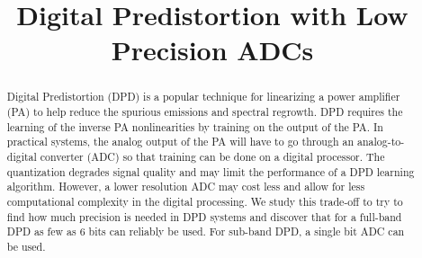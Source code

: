 \documentclass[conference]{IEEEtran}
\begin{document}
%
\title{Digital Predistortion with Low Precision ADCs}




% 
\author{
}




\maketitle

\begin{abstract}
Digital Predistortion (DPD) is a popular technique for linearizing a power amplifier (PA) to help reduce the spurious emissions and spectral regrowth. DPD requires the learning of the inverse PA nonlinearities by training on the output of the PA. In practical systems, the analog output of the PA will have to go through an analog-to-digital converter (ADC) so that training can be done on a digital processor. The quantization degrades signal quality and may limit the performance of a DPD learning algorithm. However, a lower resolution ADC may cost less and allow for less computational complexity in the digital processing. 
We study this trade-off to try to find how much precision is needed in DPD systems and discover that for a full-band DPD as few as 6 bits can reliably be used. 
For sub-band DPD, a single bit ADC can be used. 
\end{abstract}
\end{document}
